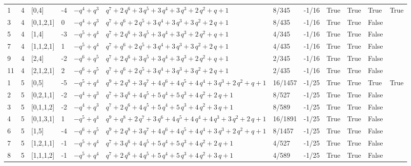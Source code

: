 \documentclass[10pt]{article}
\begin{document}
{\begin{longtable}{@{}llllllllllll@{}}
1 & 4 & [0,4] & -4 & $-q^{4} + q^{3}$ & $q^{7} + 2\,q^{6} + 3\,q^{5} + 3\,q^{4} + 3\,q^{3} + 2\,q^{2} + q + 1$ & 8/345 & -1/16 & True & True & True & True \\
3 & 4 & [0,1,2,1] & 0 & $-q^{4} + q^{3}$ & $q^{7} + q^{6} + 2\,q^{5} + 3\,q^{4} + 3\,q^{3} + 3\,q^{2} + 2\,q + 1$ & 8/435 & -1/16 & True & True & False &  \\
5 & 4 & [1,4] & -3 & $-q^{5} + q^{4}$ & $q^{7} + 2\,q^{6} + 3\,q^{5} + 3\,q^{4} + 3\,q^{3} + 2\,q^{2} + q + 1$ & 4/345 & -1/16 & True & True & False &  \\
7 & 4 & [1,1,2,1] & 1 & $-q^{5} + q^{4}$ & $q^{7} + q^{6} + 2\,q^{5} + 3\,q^{4} + 3\,q^{3} + 3\,q^{2} + 2\,q + 1$ & 4/435 & -1/16 & True & True & False &  \\
9 & 4 & [2,4] & -2 & $-q^{6} + q^{5}$ & $q^{7} + 2\,q^{6} + 3\,q^{5} + 3\,q^{4} + 3\,q^{3} + 2\,q^{2} + q + 1$ & 2/345 & -1/16 & True & True & False &  \\
11 & 4 & [2,1,2,1] & 2 & $-q^{6} + q^{5}$ & $q^{7} + q^{6} + 2\,q^{5} + 3\,q^{4} + 3\,q^{3} + 3\,q^{2} + 2\,q + 1$ & 2/435 & -1/16 & True & True & False &  \\
1 & 5 & [0,5] & -5 & $-q^{5} + q^{4}$ & $q^{9} + 2\,q^{8} + 3\,q^{7} + 4\,q^{6} + 4\,q^{5} + 4\,q^{4} + 3\,q^{3} + 2\,q^{2} + q + 1$ & 16/1457 & -1/25 & True & True & True & True \\
2 & 5 & [0,2,1,1] & -2 & $-q^{4} + q^{3}$ & $q^{7} + 3\,q^{6} + 4\,q^{5} + 5\,q^{4} + 5\,q^{3} + 4\,q^{2} + 2\,q + 1$ & 8/527 & -1/25 & True & True & False &  \\
3 & 5 & [0,1,1,2] & -2 & $-q^{4} + q^{3}$ & $q^{7} + 2\,q^{6} + 4\,q^{5} + 5\,q^{4} + 5\,q^{3} + 4\,q^{2} + 3\,q + 1$ & 8/589 & -1/25 & True & True & False &  \\
4 & 5 & [0,1,3,1] & 1 & $-q^{5} + q^{4}$ & $q^{9} + q^{8} + 2\,q^{7} + 3\,q^{6} + 4\,q^{5} + 4\,q^{4} + 4\,q^{3} + 3\,q^{2} + 2\,q + 1$ & 16/1891 & -1/25 & True & True & False &  \\
6 & 5 & [1,5] & -4 & $-q^{6} + q^{5}$ & $q^{9} + 2\,q^{8} + 3\,q^{7} + 4\,q^{6} + 4\,q^{5} + 4\,q^{4} + 3\,q^{3} + 2\,q^{2} + q + 1$ & 8/1457 & -1/25 & True & True & False &  \\
7 & 5 & [1,2,1,1] & -1 & $-q^{5} + q^{4}$ & $q^{7} + 3\,q^{6} + 4\,q^{5} + 5\,q^{4} + 5\,q^{3} + 4\,q^{2} + 2\,q + 1$ & 4/527 & -1/25 & True & True & False &  \\
8 & 5 & [1,1,1,2] & -1 & $-q^{5} + q^{4}$ & $q^{7} + 2\,q^{6} + 4\,q^{5} + 5\,q^{4} + 5\,q^{3} + 4\,q^{2} + 3\,q + 1$ & 4/589 & -1/25 & True & True & False &  \\

\end{longtable}}
\end{document}
